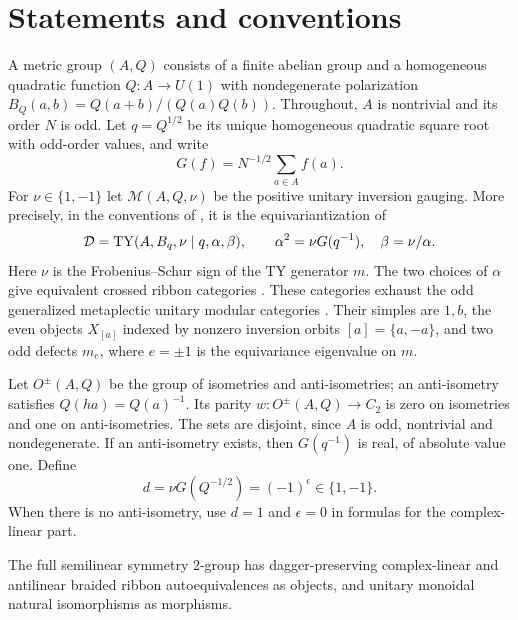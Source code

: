 \documentclass{amsart}
\theoremstyle{definition}\newtheorem{definition}[theorem]{Definition}
\theoremstyle{remark}\newtheorem{remark}[theorem]{Remark}
\newcommand{\M}{\mathcal M}\newcommand{\D}{\mathcal D}
\begin{document}
\section{Statements and conventions}

A metric group $(A,Q)$ consists of a finite abelian group and a homogeneous
quadratic function $Q:A\to U(1)$ with nondegenerate polarization
$B_Q(a,b)=Q(a+b)/(Q(a)Q(b))$. Throughout, $A$ is nontrivial and its
order $N$ is odd. Let $q=Q^{1/2}$ be its unique homogeneous quadratic
square root with odd-order values, and write
\[
                 G(f)=N^{-1/2}\sum_{a\in A}f(a).
\]
For $\nu\in\{1,-1\}$ let $\M(A,Q,\nu)$ be the positive unitary
inversion gauging. More precisely, in the conventions of
\cite[Section 3]{GLM}, it is the equivariantization of
\begin{equation}\label{eq:model}
 \D=\TY(A,B_q,\nu\mid q,\alpha,\beta),\qquad
 \alpha^2=\nu G(q^{-1}),\quad \beta=\nu/\alpha.
\end{equation}
Here $\nu$ is the Frobenius--Schur sign of the TY generator $m$.
The two choices of $\alpha$ give equivalent crossed ribbon categories
\cite[Remark 3.4]{GLM}. These categories exhaust the odd generalized
metaplectic unitary modular categories \cite[Theorem 4.8]{Bis}.
Their simples are $1,b$, the even objects $X_{[a]}$ indexed by nonzero
inversion orbits $[a]=\{a,-a\}$, and two odd defects $m_e$, where
$e=\pm1$ is the equivariance eigenvalue on $m$.

Let $O^{\pm}(A,Q)$ be the group of isometries and anti-isometries;
an anti-isometry satisfies $Q(ha)=Q(a)^{-1}$. Its parity
$w:O^{\pm}(A,Q)\to C_2$ is zero on isometries and one on anti-isometries.
The sets are disjoint, since $A$ is odd, nontrivial and nondegenerate.
If an anti-isometry exists, then $G(q^{-1})$ is real, of absolute value
one. Define
\begin{equation}\label{eq:d}
                  d=\nu G(Q^{-1/2})=(-1)^\epsilon\in\{1,-1\}.
\end{equation}
When there is no anti-isometry, use $d=1$ and $\epsilon=0$ in formulas
for the complex-linear part.

The full semilinear symmetry $2$-group has dagger-preserving complex-linear
and antilinear braided ribbon autoequivalences as objects, and unitary
monoidal natural isomorphisms as morphisms.
\end{document}

